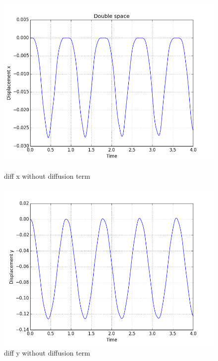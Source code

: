 \begin{figure}[ht]
\begin{minipage}[b]{0.6\linewidth}
    \centering
    \includegraphics[width=1\linewidth]{uten_diff_x.png} 
    \caption{diff x without diffusion term} 
    \vspace{4ex}
  \end{minipage}%
  \begin{minipage}[b]{0.6\linewidth}
    \centering
    \includegraphics[width=1\linewidth]{uten_diff_y.png} 
    \caption{diff y without diffusion term} 
    \vspace{4ex}
  \end{minipage} 
\end{figure}



\newpage
\newpage 

